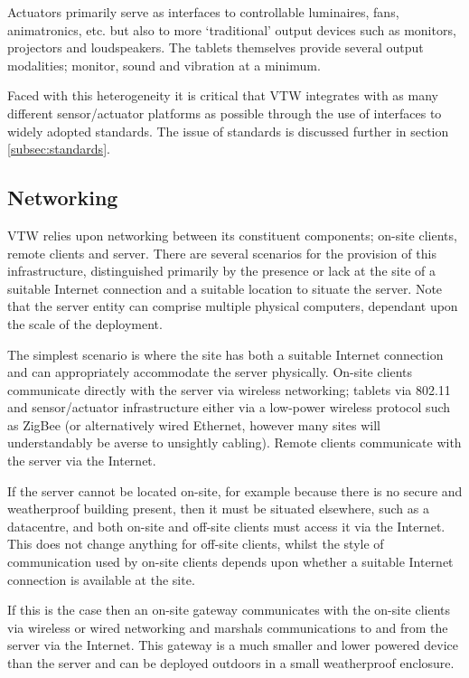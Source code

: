 \documentclass[conference,a4paper]{IEEEtran}
\begin{document}
Actuators primarily serve as interfaces to controllable luminaires, fans, animatronics, etc. but also to more `traditional' output devices such as monitors, projectors and loudspeakers. The tablets themselves provide several output modalities; monitor, sound and vibration at a minimum.

Faced with this heterogeneity it is critical that VTW integrates with as many different sensor/actuator platforms as possible through the use of interfaces to widely adopted standards. The issue of standards is discussed further in section \ref{subsec:standards}.

\subsection{Networking}
\label{subsec:networking}
VTW relies upon networking between its constituent components; on-site clients, remote clients and server. There are several scenarios for the provision of this infrastructure, distinguished primarily by the presence or lack at the site of a suitable Internet connection and a suitable location to situate the server. Note that the server entity can comprise multiple physical computers, dependant upon the scale of the deployment.

The simplest scenario is where the site has both a suitable Internet connection and can appropriately accommodate the server physically. On-site clients communicate directly with the server via wireless networking; tablets via 802.11 and sensor/actuator infrastructure either via a low-power wireless protocol such as ZigBee (or alternatively wired Ethernet, however many sites will understandably be averse to unsightly cabling). Remote clients communicate with the server via the Internet.

If the server cannot be located on-site, for example because there is no secure and weatherproof building present, then it must be situated elsewhere, such as a datacentre, and both on-site and off-site clients must access it via the Internet. This does not change anything for off-site clients, whilst the style of communication used by on-site clients depends upon whether a suitable Internet connection is available at the site.

If this is the case then an on-site gateway communicates with the on-site clients via wireless or wired networking and marshals communications to and from the server via the Internet. This gateway is a much smaller and lower powered device than the server and can be deployed outdoors in a small weatherproof enclosure.
\end{document}
